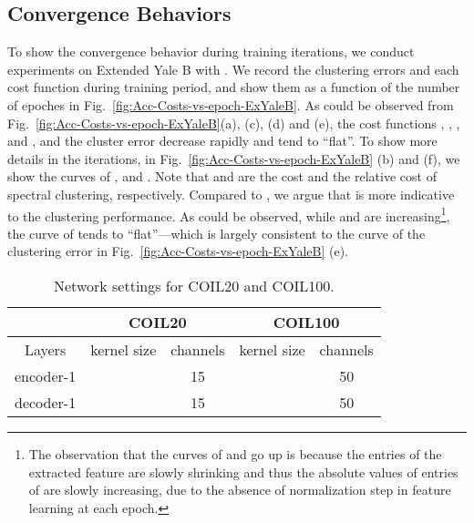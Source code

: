 \documentclass[10pt,twocolumn,letterpaper]{article}
\begin{document}
\subsection{Convergence Behaviors}

To show the convergence behavior during training iterations, we conduct experiments on Extended Yale B with . We record the clustering errors and each cost function during training period, and show them as a function of the number of epoches in Fig.~\ref{fig:Acc-Costs-vs-epoch-ExYaleB}. As could be observed from Fig.~\ref{fig:Acc-Costs-vs-epoch-ExYaleB}(a), (c), (d) and (e), the cost functions , , ,
and , and the cluster error decrease rapidly and tend to ``flat''. To show more details in the iterations, in Fig.~\ref{fig:Acc-Costs-vs-epoch-ExYaleB} (b) and (f), we show the curves of ,  and . Note that  and  are the cost and the relative cost of spectral clustering, respectively. Compared to , we argue that  is more indicative to the clustering performance. As could be observed, while  and  are increasing\footnote{The observation that the curves of  and  go up is because the entries of the extracted feature  are slowly shrinking and thus the absolute values of entries of  are slowly increasing, due to the absence of normalization step in feature learning at each epoch.}, the curve of  tends to ``flat''---which is largely consistent to the curve of the clustering error in Fig.~\ref{fig:Acc-Costs-vs-epoch-ExYaleB} (e).


\begin{table}[t]
\centering
\begin{tabular}{c|cc|cc}
\hline
    & \multicolumn{2}{c|}{COIL20} & \multicolumn{2}{c}{COIL100}\\
\hline
    Layers & kernel size & channels & kernel size & channels\\
    \hline encoder-1 &  & 15 &  & 50\\
    decoder-1 &  & 15 &  & 50\\
\hline \end{tabular}
\caption{Network settings for COIL20 and COIL100.} \label{table:setting for COIL}
\end{table}
\end{document}
